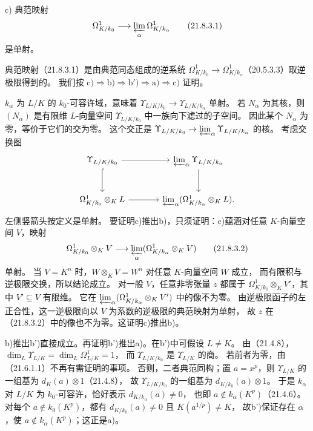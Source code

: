\noindent c) 典范映射
\begin{equation}
 \Omega^1_{K/k_0}\longrightarrow\varprojlim_\alpha\Omega^1_{K/k_\alpha}
 \tag{21.8.3.1}
\end{equation}
是单射。

典范映射（21.8.3.1）是由典范同态组成的逆系统
$\Omega^1_{K/k_0}\to\Omega^1_{K/k_\alpha}$（20.5.3.3）取逆极限得到的。
我们按 $\mathrm c)\Rightarrow\mathrm b)\Rightarrow\mathrm b')\Rightarrow\mathrm a)\Rightarrow\mathrm c)$ 证明。

\eproof
$k_\alpha$ 为 $L/K$ 的 $k_0$-可容许域，意味着
$\Upsilon_{L/K/k_0}\to\Upsilon_{L/K/k_\alpha}$ 单射。
若 $N_\alpha$ 为其核，则 $(N_\alpha)$ 是有限维 $L$-向量空间
$\Upsilon_{L/K/k_0}$ 中一族向下滤过的子空间。
因此某个 $N_\alpha$ 为零，等价于它们的交为零。
这个交正是
$\Upsilon_{L/K/k_0}\to\varprojlim_\alpha\Upsilon_{L/K/k_\alpha}$ 的核。
考虑交换图
\[
\begin{tikzcd}[column sep=large,row sep=large]
 \Upsilon_{L/K/k_0}\arrow[r]\arrow[d,hook]
 &\varprojlim_\alpha\Upsilon_{L/K/k_\alpha}\arrow[d]\\
 \Omega^1_{K/k_0}\otimes_KL\arrow[r]
 &\varprojlim_\alpha(\Omega^1_{K/k_\alpha}\otimes_KL).
\end{tikzcd}
\]
左侧竖箭头按定义是单射。
要证明c)推出b)，只须证明：c)蕴涵对任意 $K$-向量空间 $V$，映射
\begin{equation}
 \Omega^1_{K/k_0}\otimes_KV
 \longrightarrow\varprojlim_\alpha(\Omega^1_{K/k_\alpha}\otimes_KV)
 \tag{21.8.3.2}
\end{equation}
单射。
当 $V=K^n$ 时，$W\otimes_KV=W^n$ 对任意 $K$-向量空间 $W$ 成立，
而有限积与逆极限交换，所以结论成立。
对一般 $V$，任意非零张量 $z$ 都属于
$\Omega^1_{K/k_0}\otimes_KV'$，其中 $V'\subseteq V$ 有限维。
它在 $\varprojlim_\alpha(\Omega^1_{K/k_\alpha}\otimes_KV')$ 中的像不为零。
由逆极限函子的左正合性，这一逆极限向以 $V$ 为系数的逆极限的典范映射为单射，
故 $z$ 在（21.8.3.2）中的像也不为零。这证明c)推出b)。

b)推出b')直接成立。再证明b')推出a)。在b')中可假设 $L\ne K$。
由（21.4.8），$\dim_L\Upsilon_{L/K}=\dim_L\Omega^1_{L/K}=1$，
而 $\Upsilon_{L/K/k_0}$ 是 $\Upsilon_{L/K}$ 的商。
若前者为零，由（21.6.1.1）不再有需证明的事项。
否则，二者典范同构；置 $a=x^p$，则 $\Upsilon_{L/K}$ 的一组基为
$d_K(a)\otimes1$（21.4.8），
故 $\Upsilon_{L/K/k_0}$ 的一组基为 $d_{K/k_0}(a)\otimes1$。
于是 $k_\alpha$ 对 $L/K$ 为 $k_0$-可容许，恰好表示 $d_{K/k_\alpha}(a)\ne0$，
也即 $a\notin k_\alpha(K^p)$（21.4.6）。
对每个 $a\notin k_0(K^p)$，都有 $d_{K/k_0}(a)\ne0$ 且 $K(a^{1/p})\ne K$，
故b')保证存在 $\alpha$，使 $a\notin k_\alpha(K^p)$；这正是a)。

